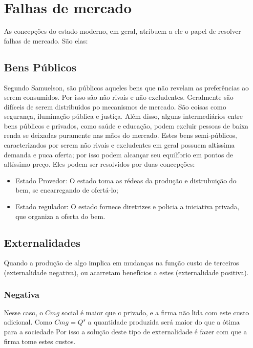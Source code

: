 \documentclass[12pt,a4paper,oneside,brazil]{abntex2}
\begin{document}
\section{Falhas de mercado}
As concepções do estado moderno, em geral, atribuem a ele o papel de resolver falhas de mercado. São elas:
\subsection{Bens Públicos}
Segundo Samuelson, são públicos aqueles bens que não revelam as preferências ao serem consumidos. Por isso são não rivais e não excludentes. Geralmente são difíceis de serem distribuidos po mecanismos de mercado. São coisas como segurança, iluminação pública e justiça. Além disso, alguns intermediários entre bens públicos e privados, como saúde e educação, podem excluir pessoas de baixa renda se deixadas puramente nas mãos do mercado. Estes bens semi-públicos, caracterizados por serem não rivais e excludentes em geral possuem altíssima demanda e puca oferta; por isso podem alcançar seu equilíbrio em pontos de altíssimo preço. Eles podem ser resolvidos por duas concepções:
\begin{itemize}
\item Estado Provedor: O estado toma as rédeas da produção e distrubuição do bem, se encarregando de ofertá-lo;
\item Estado regulador: O estado fornece diretrizes e policia a iniciativa privada, que organiza a oferta do bem.
\end{itemize}

\subsection{Externalidades}
Quando a produção de algo implica em mudanças na função custo de terceiros (externalidade negativa), ou acarretam benefícios a estes (externalidade positiva).
\subsubsection{Negativa}
Nesse caso, o $Cmg$ social é maior que o privado, e a firma não lida com este custo adicional. Como $Cmg = Q^s$ a quantidade produzida será maior do que a ótima para a sociedade Por isso a solução deste tipo de externalidade é fazer com que a firma tome estes custos.
\end{document}

